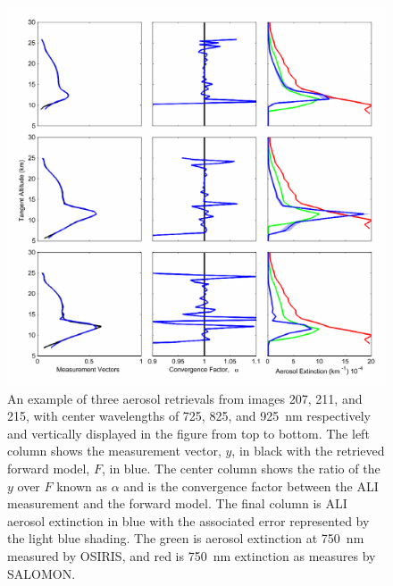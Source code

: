 \documentclass[12pt]{article}
\begin{document}
\begin{figure}
\includegraphics[width=1.0\textwidth]{./Images/AliRetreivals.pdf}
    \caption{An example of three aerosol retrievals from images 207, 211, and 215, with center wavelengths of 725, 825, and 925~nm respectively and vertically displayed in the figure from top to bottom. The left column shows the measurement vector, $y$, in black with the retrieved forward model, $F$, in blue. The center column shows the ratio of the $y$ over $F$ known as $\alpha$ and is the convergence factor between the ALI measurement and the forward model. The final column is ALI aerosol extinction in blue with the associated error represented by the light blue shading. The green is aerosol extinction at 750~nm measured by OSIRIS, and red is 750~nm extinction as measures by SALOMON.}
    \label{fig:AliRetreivals}
\end{figure}

\newpage
\end{document}
